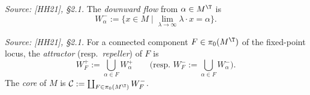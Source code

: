 \begin{definition}
  \label{def:downward_flow}
  \textit{Source: [HH21], §2.1.}
  The \emph{downward flow} from \(\alpha \in M^{\T}\) is
  \[
    W^-_\alpha := \{ x \in M \mid \lim_{\lambda \to \infty} \lambda \cdot x = \alpha \}.
  \]
\end{definition}

\begin{definition}
  \label{def:attractor}
  \textit{Source: [HH21], §2.1.}
  For a connected component \(F \in \pi_0(M^{\T})\) of the fixed-point locus, the
  \emph{attractor} (resp.\ \emph{repeller}) of \(F\) is
  \[
    W^+_F := \bigcup_{\alpha \in F} W^+_\alpha
    \qquad \text{(resp.\ } W^-_F := \bigcup_{\alpha \in F} W^-_\alpha \text{)}.
  \]
  The \emph{core} of \(M\) is \(\mathcal{C} := \coprod_{F \in \pi_0(M^{\T})} W^-_F\).
\end{definition}

